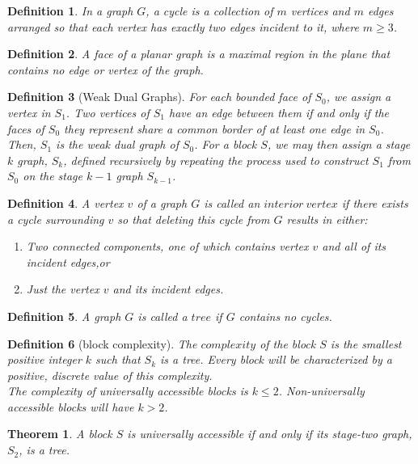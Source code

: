 \documentclass[10pt]{article}
\newtheorem{definition}{Definition}
\newtheorem{theorem}{Theorem}
\begin{document}
\begin{definition}
In a graph $G$, a cycle is a collection of $m$ vertices and $m$ edges arranged so that each vertex has exactly two edges incident to it, where $m \ge 3$.
\end{definition}

\begin{definition}
A face of a planar graph is a maximal region in the plane that contains no edge or vertex of the graph.
\end{definition}

\begin{definition}[Weak Dual Graphs]
For each bounded face of $S_0$, we assign a vertex in $S_1$. Two vertices of $S_1$ have an edge between them if and only if the faces of $S_0$ they represent share a common border of at least one edge in $S_0$. Then, $S_1$ is the weak dual graph of $S_0$. For a block $S$, we may then assign a stage $k$ graph, $S_k$, defined recursively by repeating the process used to construct $S_1$ from $S_0$ on the stage $k-1$ graph $S_{k-1}$.
\end{definition}

\begin{definition}
A vertex $v$ of a graph $G$ is called an $interior\ vertex$ if there exists a cycle surrounding $v$ so that deleting this cycle from $G$ results in either:
    \begin{enumerate}
        \item Two connected components, one of which contains vertex $v$ and all of its incident edges,or
        \item Just the vertex $v$ and its incident edges.
    \end{enumerate}
\end{definition}

\begin{definition}
A graph $G$ is called a $tree$ if $G$ contains no cycles. 
\end{definition}

\begin{definition}[block complexity]
The $complexity$ of the block $S$ is the smallest positive integer $k$ such that $S_k$ is a tree. Every block will be characterized by a positive, discrete value of this complexity. \\
The complexity of universally accessible blocks is $k \leq 2$. Non-universally accessible blocks will have $k>2$.
\end{definition}

\begin{theorem}
    A block $S$ is universally accessible if and only if its stage-two graph, $S_2$, is a tree.
\end{theorem}
\end{document}
